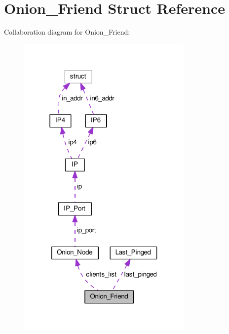 \hypertarget{struct_onion___friend}{\section{Onion\+\_\+\+Friend Struct Reference}
\label{struct_onion___friend}
}


Collaboration diagram for Onion\+\_\+\+Friend\+:\nopagebreak
\begin{figure}[H]
\begin{center}
\leavevmode
\includegraphics[width=243pt]{struct_onion___friend__coll__graph}
\end{center}
\end{figure}
